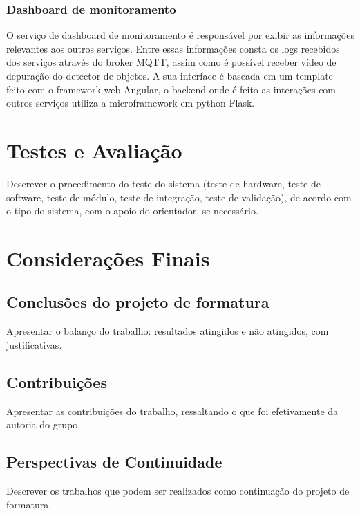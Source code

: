 \documentclass[]{politex}
\begin{document}
\subsection{Dashboard de monitoramento}
O serviço de dashboard de monitoramento é responsável por exibir as informações relevantes aos outros serviços. Entre essas informações consta os logs recebidos dos serviços através do broker MQTT, assim como é possível receber vídeo de depuração do detector de objetos. A sua interface é baseada em um template feito com o framework web Angular, o backend onde é feito as interações com outros serviços utiliza a microframework em python Flask.

\chapter{Testes e Avaliação}
Descrever o procedimento do teste do sistema (teste de hardware, teste de software, teste de módulo, teste de integração, teste de validação), de acordo com o tipo do sistema, com o apoio do orientador, se necessário.


\chapter{Considerações Finais}

\section{Conclusões do projeto de formatura}
Apresentar o balanço do trabalho: resultados atingidos e não atingidos, com justificativas.

\section{Contribuições}
Apresentar as contribuições do trabalho, ressaltando o que foi efetivamente da autoria do grupo.

\section{Perspectivas de Continuidade}
Descrever os trabalhos que podem ser realizados como continuação do projeto de formatura.



\end{document}
